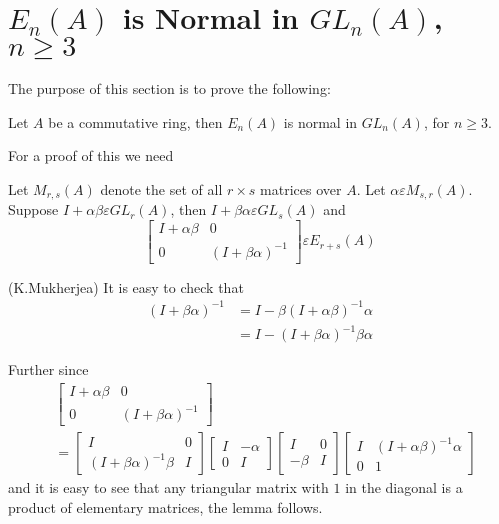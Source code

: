 \section{\texorpdfstring{$E_n(A)$}{EnA} is Normal in \texorpdfstring{$GL_n(A)$, $n\geq 3$}{GLn}}\label{c1:s4}

The purpose of this section is to prove the following:

\begin{thm}\label{c1:thm4.1}
Let $A$ be a commutative ring, then $E_n(A)$ is normal in $GL_n(A)$,
for $n\geq 3$.
\end{thm}
 
For a proof of this we need
\begin{lem}\label{c1:lem4.2}
Let $M_{r,s}(A)$ denote the set of all $r\times s$ matrices over
$A$. Let $\alpha \varepsilon M_{s,r}(A)$. Suppose $I+\alpha\beta
\varepsilon GL_r(A)$, then $I+\beta\alpha \varepsilon GL_s(A)$ and 
$$
\begin{bmatrix}
I+\alpha\beta & 0\\
0 & (I+\beta\alpha)^{-1}
\end{bmatrix} \varepsilon E_{r+s}(A)
$$
\end{lem}

\begin{Proof}
(K.Mukherjea) It is easy to check that 
\begin{align*}
(I+\beta\alpha)^{-1}&=I-\beta(I+\alpha\beta)^{-1}\alpha\\
&=I-(I+\beta\alpha)^{-1}\beta\alpha
\end{align*}

Further since
\begin{align*}
& \begin{bmatrix}
I+\alpha\beta & 0\\
0 & (I+\beta\alpha)^{-1}
\end{bmatrix}\\
&= \begin{bmatrix}
I & 0\\
(I+\beta\alpha)^{-1}\beta & I
\end{bmatrix} \begin{bmatrix}
I &-\alpha\\
0 & I
\end{bmatrix} \begin{bmatrix}
I & 0\\
-\beta & I
\end{bmatrix}\begin{bmatrix}
I & (I+\alpha\beta)^{-1}\alpha\\
0 & 1
\end{bmatrix}
\end{align*} 
and it is easy to see that any triangular matrix with $1$ in the
diagonal is a product of elementary matrices, the lemma follows.
\enprf
\end{Proof}


